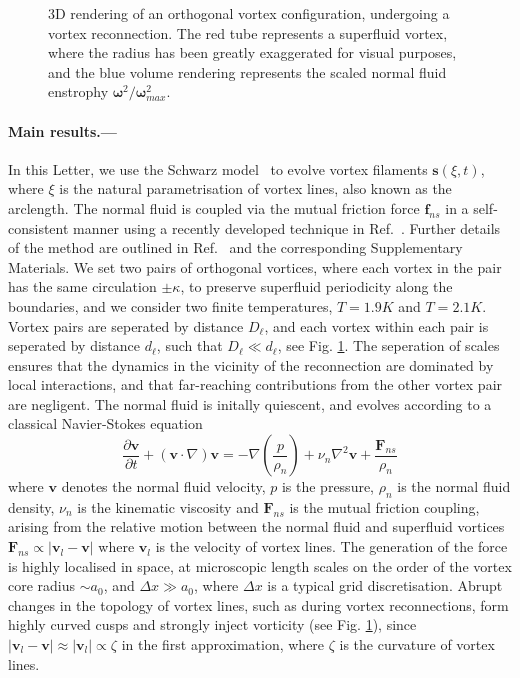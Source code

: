\documentclass[%
 reprint,
 amsmath,amssymb,
 aps,
 prl,
]{revtex4-2}
\newcommand{\bom}{\boldsymbol{\omega}}
\def \s{\mathbf{s}}
\def \v{\mathbf{v}}
\begin{document}
\begin{figure}
\begin{subfigure}[b]{0.24\textwidth}
	\end{subfigure}
    \hfill
	\caption{3D rendering of an orthogonal vortex configuration, undergoing a vortex reconnection. The red tube represents a superfluid vortex, where the radius has been greatly exaggerated for visual purposes, and the blue volume rendering represents the scaled normal fluid enstrophy $\bom^2/\bom^2_{max}$.}
    \label{fig:visualisation}
\end{figure}







\paragraph*{Main results.---} In this Letter, we use the Schwarz model~\cite{schwarz1988} to evolve vortex filaments $\s(\xi,t)$, where $\xi$ is the natural parametrisation of vortex lines, also known as the arclength. The normal fluid is coupled via the mutual friction force $\mathbf{f}_{ns}$ in a self-consistent manner using a recently developed technique in Ref.~\cite{galantucciNewSelfconsistentApproach2020b}. Further details of the method are outlined in Ref.~\cite{PunctuatedEnergyInjectionb} and the corresponding Supplementary Materials. We set two pairs of orthogonal vortices, where each vortex in the pair has the same circulation $\pm\kappa$, to preserve superfluid periodicity along the boundaries, and we consider two finite temperatures, $T=1.9K$ and $T=2.1K$. Vortex pairs are seperated by distance $D_{\ell}$, and each vortex within each pair is seperated by distance $d_{\ell}$, such that $D_{\ell}\ll d_{\ell}$, see Fig. \ref{fig:visualisation}. The seperation of scales ensures that the dynamics in the vicinity of the reconnection are dominated by local interactions, and that far-reaching contributions from the other vortex pair are negligent. The normal fluid is initally quiescent, and evolves according to a classical Navier-Stokes equation
\begin{equation}
    \frac{\partial\v}{\partial t } + (\v\cdot\nabla)\v = -\nabla\left(\frac{p}{\rho_n}\right) + \nu_n\nabla^2\v + \frac{\mathbf{F}_{ns}}{\rho_n}
\end{equation} 
where $\v$ denotes the normal fluid velocity, $p$ is the pressure, $\rho_n$ is the normal fluid density, $\nu_n$ is the kinematic viscosity and $\mathbf{F}_{ns}$ is the mutual friction coupling, arising from the relative motion between the normal fluid and superfluid vortices $\mathbf{F}_{ns}\propto \left|\v_{l}-\v\right|$ where $\v_l$ is the velocity of vortex lines. The generation of the force is highly localised in space, at microscopic length scales on the order of the vortex core radius $\sim a_0$, and $\Delta x \gg a_0$, where $\Delta x$ is a typical grid discretisation. Abrupt changes in the topology of vortex lines, such as during vortex reconnections, form highly curved cusps and strongly inject vorticity (see Fig. \ref{fig:visualisation}), since $|\v_l-\v|\approx|\v_l|\propto\zeta$ in the first approximation, where $\zeta$ is the curvature of vortex lines. 
\end{document}
